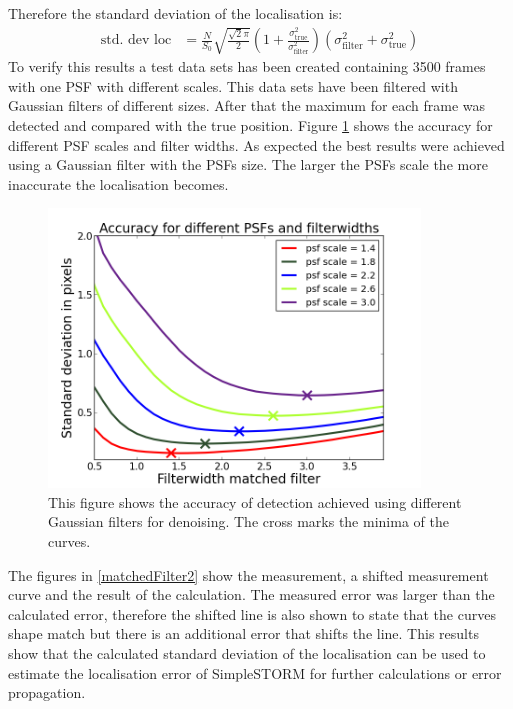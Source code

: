 Therefore the standard deviation of the localisation is:
\begin{align}
 \text{std. dev loc}&=\frac{N}{S_0}\sqrt{\frac{\sqrt{2}\pi}{2}}
 \left(1+\frac{\sigma_\text{true}^2}{\sigma_\text{filter}^2}\right)\left(\sigma_\text{filter}^2+\sigma_\text{true}^2\right) 
\end{align}
To verify this results a test data sets has been created containing 3500 frames with one PSF with different scales. This data sets have been filtered with Gaussian filters of different sizes. After that the maximum for each frame was detected and compared with the true position. Figure \ref{matchedFilter1} shows the accuracy for different PSF scales and filter widths.\newline
As expected the best results were achieved using a Gaussian filter with the PSFs size. The larger the PSFs scale the more inaccurate the localisation becomes.\newline

\begin{figure}
\centering
\includegraphics[width = 0.88\textwidth]{pictures/matchedFilterPlots1.png}
	 \caption{This figure shows the accuracy of detection achieved using different Gaussian filters for denoising. The cross marks the minima of the curves.}
	\label{matchedFilter1}
\end{figure}

The figures in \ref{matchedFilter2} show the measurement, a shifted measurement curve and the result of the calculation. The measured error was larger than the calculated error, therefore the shifted line is also shown to state that the curves shape match but there is an additional error that shifts the line. \newline
This results show that the calculated standard deviation of the localisation can be used to estimate the localisation error of SimpleSTORM for further calculations or error propagation.

